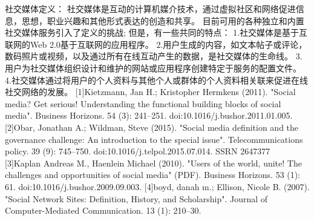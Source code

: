 社交媒体定义：%
社交媒体是互动的计算机媒介技术，通过虚拟社区和网络促进信息，思想，职业兴趣和其他形式表达的创造和共享。 目前可用的各种独立和内置社交媒体服务引入了定义的挑战; 但是，有一些共同的特点：
     1.社交媒体是基于互联网的Web 2.0基于互联网的应用程序。
     2.用户生成的内容，如文本帖子或评论，数码照片或视频，以及通过所有在线互动产生的数据，是社交媒体的生命线。
     3.用户为社交媒体组织设计和维护的网站或应用程序创建特定于服务的配置文件。
     4.社交媒体通过将用户的个人资料与其他个人或群体的个人资料相关联来促进在线社交网络的发展。
[1]Kietzmann, Jan H.; Kristopher Hermkens (2011). "Social media? Get serious! Understanding the functional building blocks of social media". Business Horizons. 54 (3): 241–251. doi:10.1016/j.bushor.2011.01.005.
[2]Obar, Jonathan A.; Wildman, Steve (2015). "Social media definition and the governance challenge: An introduction to the special issue". Telecommunications policy. 39 (9): 745–750. doi:10.1016/j.telpol.2015.07.014. SSRN 2647377 
[3]Kaplan Andreas M., Haenlein Michael (2010). "Users of the world, unite! The challenges and opportunities of social media" (PDF). Business Horizons. 53 (1): 61. doi:10.1016/j.bushor.2009.09.003.
[4]boyd, danah m.; Ellison, Nicole B. (2007). "Social Network Sites: Definition, History, and Scholarship". Journal of Computer-Mediated Communication. 13 (1): 210–30. 
     
